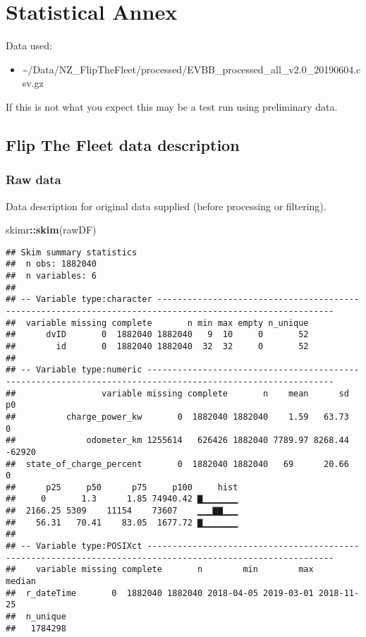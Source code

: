 \documentclass[]{article}
\newenvironment{Shaded}{\begin{snugshade}}{\end{snugshade}}
\newcommand{\KeywordTok}[1]{\textcolor[rgb]{0.13,0.29,0.53}{\textbf{#1}}}
\newcommand{\NormalTok}[1]{#1}
\newcommand{\OperatorTok}[1]{\textcolor[rgb]{0.81,0.36,0.00}{\textbf{#1}}}
\providecommand{\tightlist}{%
  \setlength{\itemsep}{0pt}\setlength{\parskip}{0pt}}
\begin{document}
\hypertarget{statistical-annex}{%
\section{Statistical Annex}\label{statistical-annex}}

Data used:

\begin{itemize}
\tightlist
\item
  \textasciitilde{}/Data/NZ\_FlipTheFleet/processed/EVBB\_processed\_all\_v2.0\_20190604.csv.gz
\end{itemize}

If this is not what you expect this may be a test run using preliminary data.

\hypertarget{flip-the-fleet-data-description}{%
\subsection{Flip The Fleet data description}\label{flip-the-fleet-data-description}}

\hypertarget{raw-data}{%
\subsubsection{Raw data}\label{raw-data}}

Data description for original data supplied (before processing or filtering).

\begin{Shaded}
\begin{Highlighting}[]
\NormalTok{skimr}\OperatorTok{::}\KeywordTok{skim}\NormalTok{(rawDF)}
\end{Highlighting}
\end{Shaded}

\begin{verbatim}
## Skim summary statistics
##  n obs: 1882040 
##  n variables: 6 
## 
## -- Variable type:character ---------------------------------------------------------------------------------------------------------
##  variable missing complete       n min max empty n_unique
##      dvID       0  1882040 1882040   9  10     0       52
##        id       0  1882040 1882040  32  32     0       52
## 
## -- Variable type:numeric -----------------------------------------------------------------------------------------------------------
##                 variable missing complete       n    mean      sd     p0
##          charge_power_kw       0  1882040 1882040    1.59   63.73      0
##              odometer_km 1255614   626426 1882040 7789.97 8268.44 -62920
##  state_of_charge_percent       0  1882040 1882040   69      20.66      0
##      p25     p50      p75     p100     hist
##     0       1.3      1.85 74940.42 ▇▁▁▁▁▁▁▁
##  2166.25 5309    11154    73607    ▁▁▁▇▇▁▁▁
##    56.31   70.41    83.05  1677.72 ▇▁▁▁▁▁▁▁
## 
## -- Variable type:POSIXct -----------------------------------------------------------------------------------------------------------
##    variable missing complete       n        min        max     median
##  r_dateTime       0  1882040 1882040 2018-04-05 2019-03-01 2018-11-25
##  n_unique
##   1784298
\end{verbatim}
\end{document}
